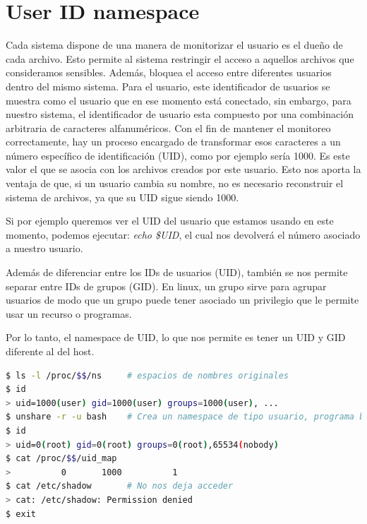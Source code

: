 \documentclass[a4paper, oneside, 12pt]{book}
\begin{document}
	
	\pagebreak
	
	\section{User ID namespace}
	\par \noindent Cada sistema dispone de una manera de monitorizar el usuario es el dueño de cada archivo. Esto permite al sistema restringir el acceso a aquellos archivos que consideramos sensibles. Además, bloquea el acceso entre diferentes usuarios dentro del mismo sistema. Para el usuario, este identificador de usuarios se muestra como el usuario que en ese momento está conectado, sin embargo, para nuestro sistema, el identificador de usuario esta compuesto por una combinación arbitraria de caracteres alfanuméricos. Con el fin de mantener el monitoreo correctamente, hay un proceso encargado de transformar esos caracteres a un número específico de identificación (UID), como por ejemplo sería 1000. Es este valor el que se asocia con los archivos creados por este usuario. Esto nos aporta la ventaja de que, si un usuario cambia su nombre, no es necesario reconstruir el sistema de archivos, ya que su UID sigue siendo 1000.\\
	
	\par \noindent Si por ejemplo queremos ver el UID del usuario que estamos usando en este momento, podemos ejecutar: \textit{echo \$UID}, el cual nos devolverá el número asociado a nuestro usuario. \\
	
	\par \noindent Además de diferenciar entre los IDs de usuarios (UID), también se nos permite separar entre IDs de grupos (GID). En linux, un grupo sirve para agrupar usuarios de modo que un grupo puede tener asociado un privilegio que le permite usar un recurso o programas.\\
	
	\par \noindent Por lo tanto, el namespace de UID, lo que nos permite es tener un UID y GID diferente al del host. 
	
	\begin{lstlisting}[language=bash, caption=Ejemplo de uso UID namespace]
$ ls -l /proc/$$/ns		# espacios de nombres originales
$ id
> uid=1000(user) gid=1000(user) groups=1000(user), ...
$ unshare -r -u bash	# Crea un namespace de tipo usuario, programa bash
$ id
> uid=0(root) gid=0(root) groups=0(root),65534(nobody)
$ cat /proc/$$/uid_map
>          0       1000          1
$ cat /etc/shadow		# No nos deja acceder
> cat: /etc/shadow: Permission denied
$ exit
	\end{lstlisting}
	
\end{document}

